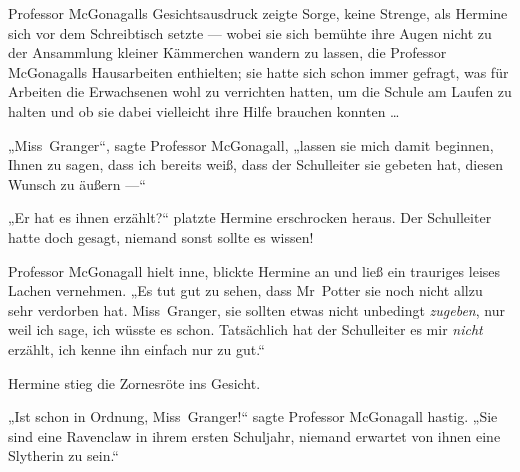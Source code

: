 Professor McGonagalls Gesichtsausdruck zeigte Sorge, keine Strenge, als Hermine sich vor dem Schreibtisch setzte — wobei sie sich bemühte ihre Augen nicht zu der Ansammlung kleiner Kämmerchen wandern zu lassen, die Professor McGonagalls Hausarbeiten enthielten; sie hatte sich schon immer gefragt, was für Arbeiten die Erwachsenen wohl zu verrichten hatten, um die Schule am Laufen zu halten und ob sie dabei vielleicht ihre Hilfe brauchen konnten …

„Miss~Granger“, sagte Professor McGonagall, „lassen sie mich damit beginnen, Ihnen zu sagen, dass ich bereits weiß, dass der Schulleiter sie gebeten hat, diesen Wunsch zu äußern —“

„Er hat es ihnen erzählt?“ platzte Hermine erschrocken heraus. Der Schulleiter hatte doch gesagt, niemand sonst sollte es wissen!

Professor McGonagall hielt inne, blickte Hermine an und ließ ein trauriges leises Lachen vernehmen.
„Es tut gut zu sehen, dass Mr~Potter sie noch nicht allzu sehr verdorben hat. Miss~Granger, sie sollten etwas nicht unbedingt \emph{zugeben}, nur weil ich sage, ich wüsste es schon. Tatsächlich hat der Schulleiter es mir \emph{nicht} erzählt, ich kenne ihn einfach nur zu gut.“

Hermine stieg die Zornesröte ins Gesicht.

„Ist schon in Ordnung, Miss~Granger!“ sagte Professor McGonagall hastig.
„Sie sind eine Ravenclaw in ihrem ersten Schuljahr, niemand erwartet von ihnen eine Slytherin zu sein.“

